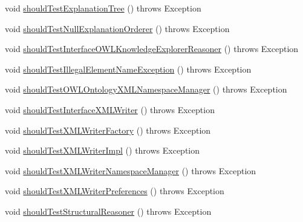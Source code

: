 \begin{DoxyCompactItemize}
\item 
void \hyperlink{classorg_1_1semanticweb_1_1owlapi_1_1contract_1_1_contract_medium_test_a829dfce0572c846d7b66bb954da53a5f}{should\-Test\-Explanation\-Tree} ()  throws Exception 
\item 
void \hyperlink{classorg_1_1semanticweb_1_1owlapi_1_1contract_1_1_contract_medium_test_ae997e0954806665e7f536689d3de10d7}{should\-Test\-Null\-Explanation\-Orderer} ()  throws Exception 
\item 
void \hyperlink{classorg_1_1semanticweb_1_1owlapi_1_1contract_1_1_contract_medium_test_ac560cccbadd0b27cd4c927ea28f81133}{should\-Test\-Interface\-O\-W\-L\-Knowledge\-Explorer\-Reasoner} ()  throws Exception 
\item 
void \hyperlink{classorg_1_1semanticweb_1_1owlapi_1_1contract_1_1_contract_medium_test_ab63ce6efbcd2dbcd1a2e35a61bc824eb}{should\-Test\-Illegal\-Element\-Name\-Exception} ()  throws Exception 
\item 
void \hyperlink{classorg_1_1semanticweb_1_1owlapi_1_1contract_1_1_contract_medium_test_ab83b7ee5f98d08792d7d0beb7512c695}{should\-Test\-O\-W\-L\-Ontology\-X\-M\-L\-Namespace\-Manager} ()  throws Exception 
\item 
void \hyperlink{classorg_1_1semanticweb_1_1owlapi_1_1contract_1_1_contract_medium_test_a5d6862f53549d098542be64f3647f276}{should\-Test\-Interface\-X\-M\-L\-Writer} ()  throws Exception 
\item 
void \hyperlink{classorg_1_1semanticweb_1_1owlapi_1_1contract_1_1_contract_medium_test_a0499e3523f74fc9b20f38831be622c5c}{should\-Test\-X\-M\-L\-Writer\-Factory} ()  throws Exception 
\item 
void \hyperlink{classorg_1_1semanticweb_1_1owlapi_1_1contract_1_1_contract_medium_test_aa8e4bc7cfc12981c998711333b9fedd0}{should\-Test\-X\-M\-L\-Writer\-Impl} ()  throws Exception 
\item 
void \hyperlink{classorg_1_1semanticweb_1_1owlapi_1_1contract_1_1_contract_medium_test_acb52d0dedf76e9a55a0652d205b8f33f}{should\-Test\-X\-M\-L\-Writer\-Namespace\-Manager} ()  throws Exception 
\item 
void \hyperlink{classorg_1_1semanticweb_1_1owlapi_1_1contract_1_1_contract_medium_test_a74ef1a1aa7c97f70a1990fd7b71d946e}{should\-Test\-X\-M\-L\-Writer\-Preferences} ()  throws Exception 
\item 
void \hyperlink{classorg_1_1semanticweb_1_1owlapi_1_1contract_1_1_contract_medium_test_ac1737a8eb99af9976b1dcb50a7cb19ec}{should\-Test\-Structural\-Reasoner} ()  throws Exception 

\end{DoxyCompactItemize}
